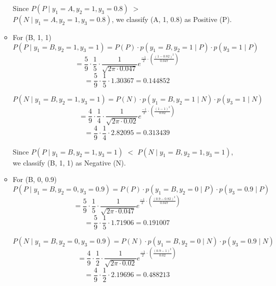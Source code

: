 \documentclass[12pt]{article}
\begin{document}
\begin{enumerate}[leftmargin=\labelsep, label=\textbf{\arabic*.)}]
\begin{itemize}
                    Since \( P(P \mid y_1 = A, y_2 = 1, y_3 = 0.8) \) \(>\) \( P(N \mid y_1 = A, y_2 = 1, y_3 = 0.8) \), we classify (A, 1, 0.8) as Positive (P).

            \vspace{0.5em}
              \item For (B, 1, 1)
                    \[
                        P(P \mid y_1 = B, y_2 = 1, y_3 = 1) = P(P) \cdot p(y_1 = B, y_2 = 1 \mid P) \cdot p(y_3 = 1 \mid P)
                    \]
                    \[
                        = \frac{5}{9} \cdot \frac{1}{5} \cdot \frac{1}{\sqrt{2\pi \cdot 0.047}} e^{\frac{-1}{2} \cdot (\frac{(1 - 0.82)^2}{0.047})}
                    \]
                    \[
                        = \frac{5}{9} \cdot \frac{1}{5} \cdot 1.30367 = 0.144852
                    \]

                    \[
                        P(N \mid y_1 = B, y_2 = 1, y_3 = 1) = P(N) \cdot p(y_1 = B, y_2 = 1 \mid N) \cdot p(y_3 = 1 \mid N)
                    \]
                    \[
                        = \frac{4}{9} \cdot \frac{1}{4} \cdot \frac{1}{\sqrt{2\pi \cdot 0.02}} e^{\frac{-1}{2} \cdot (\frac{(1 - 1)^2}{0.02})}
                    \]
                    \[
                        = \frac{4}{9} \cdot \frac{1}{4} \cdot 2.82095 = 0.313439
                    \]

                    Since \( P(P \mid y_1 = B, y_2 = 1, y_3 = 1) \) \(<\) \( P(N \mid y_1 = B, y_2 = 1, y_3 = 1) \), we classify (B, 1, 1) as Negative (N).

            \vspace{0.5em}
              \item For (B, 0, 0.9)
                    \[
                        P(P \mid y_1 = B, y_2 = 0, y_3 = 0.9) = P(P) \cdot p(y_1 = B, y_2 = 0 \mid P) \cdot p(y_3 = 0.9 \mid P)
                    \]
                    \[
                        = \frac{5}{9} \cdot \frac{1}{5} \cdot \frac{1}{\sqrt{2\pi \cdot 0.047}} e^{\frac{-1}{2} \cdot (\frac{(0.9 - 0.82)^2}{0.047})}
                    \]
                    \[
                        = \frac{5}{9} \cdot \frac{1}{5} \cdot 1.71906 = 0.191007
                    \]

                    \[
                        P(N \mid y_1 = B, y_2 = 0, y_3 = 0.9) = P(N) \cdot p(y_1 = B, y_2 = 0 \mid N) \cdot p(y_3 = 0.9 \mid N)
                    \]
                    \[
                        = \frac{4}{9} \cdot \frac{1}{2} \cdot \frac{1}{\sqrt{2\pi \cdot 0.02}} e^{\frac{-1}{2} \cdot (\frac{(0.9 - 1)^2}{0.02})}
                    \]
                    \[
                        = \frac{4}{9} \cdot \frac{1}{2} \cdot 2.19696 = 0.488213
                    \]


\end{itemize}
\end{enumerate}
\end{document}
